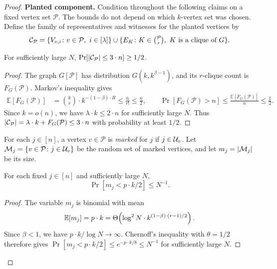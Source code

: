 \begin{proof}
    \par\noindent\textbf{Planted component.}
    Condition throughout the following claims on a fixed vertex set $\mathcal P$. The bounds do not depend on which $k$-vertex set was chosen.
    Define the family of representatives and witnesses for the planted vertices by
    \[
        \mathcal{C}_{\mathcal P}
        =\{V_{v,i}\colon v\in\mathcal P,\ i\in[\lambda]\}
        \cup\{E_K\colon K\in\textstyle\binom{\mathcal P}{r},\ K\text{ is a clique of }G\}.
    \]
    \begin{claim}\label{claim:PDS-planted-size}
        For sufficiently large $N$, $\Pr[\mathopen{}\left| \mathcal{C}_{\mathcal P} \right|\leq3\cdot n]\geq1/2$.
    \end{claim}
    \begin{proof}
        The graph $G[\mathcal P]$ has distribution $G(k,k^{\beta-1})$, and its $r$-clique count is $F_G(\mathcal P)$. Markov's inequality gives
        \begin{align*}
            \mathbb{E}[F_G(\mathcal P)]&=\binom{k}{r}\cdot k^{-(1-\beta)\cdot R}\leq\frac{n}{r!}\leq\frac n2,\qquad
            \Pr[F_G(\mathcal P)>n]\leq\frac{\mathbb{E}[F_G(\mathcal P)]}{n}\leq\frac12.
        \end{align*}
        Since $k=o(n)$, we have $\lambda\cdot k\leq2\cdot n$ for sufficiently large $N$. Thus $\mathopen{}\left| \mathcal{C}_{\mathcal P} \right|=\lambda\cdot k+F_G(\mathcal P)\leq3\cdot n$ with probability at least $1/2$.
    \end{proof}

    For each $j\in[n]$, a vertex $v\in\mathcal P$ is \emph{marked} for $j$ if $j\in\mathcal{U}_v$. Let $\mathcal M_j=\{v\in\mathcal P\colon j\in\mathcal{U}_v\}$ be the random set of marked vertices, and let $m_j=\mathopen{}\left| \mathcal M_j \right|$ be its size.
    \begin{claim}\label{claim:PDS-marked-size}
        For each fixed $j\in[n]$ and sufficiently large $N$,
        \[
            \Pr[m_j<p\cdot k/2]\leq N^{-1}.
        \]
    \end{claim}
    \begin{proof}
    The variable $m_j$ is binomial with mean
    \[
        \mathbb{E}[m_j]=p\cdot k=\Theta\mathopen{}\left( \log^2 N\cdot k^{(1-\beta)\cdot(r-1)/2} \right).
    \]
    Since $\beta<1$, we have $p\cdot k/\log N\to\infty$. Chernoff's inequality with $\theta=1/2$ therefore gives $\Pr[m_j<p\cdot k/2]\leq e^{-p\cdot k/8}\leq N^{-1}$ for sufficiently large $N$.
    \end{proof}


\end{proof}
